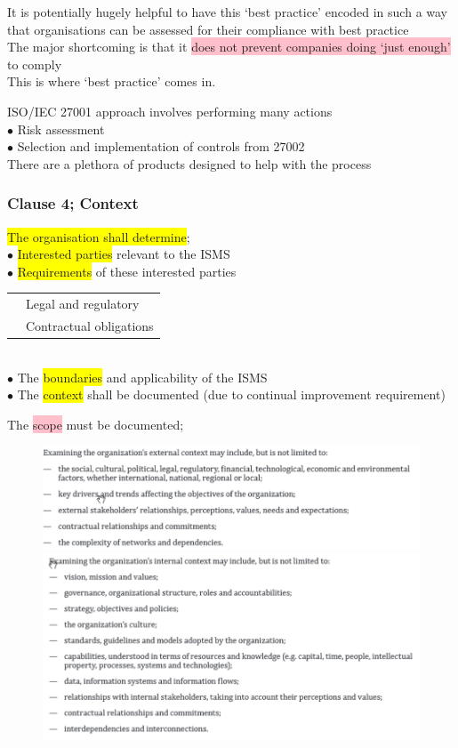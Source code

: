 \documentclass[tikz,border=10pt]{project_plan}
\newcommand{\bulletPoint}{\hspace{-3.1pt}$\bullet$ \hspace{5pt}}
\begin{document}
It is potentially hugely helpful to have this ‘best practice’ encoded in such a way that organisations can be assessed for their compliance with best practice\\
The major shortcoming is that it \colorbox{pink}{does not prevent companies doing ‘just enough’} to comply\\
This is where ‘best practice’ comes in.

ISO/IEC 27001 approach involves performing many actions\\
\bulletPoint Risk assessment\\
\bulletPoint Selection and implementation of controls from 27002\\
There are a plethora of products designed to help with the process

\newpage

\subsubsection{Clause 4; Context}
\colorbox{yellow}{The organisation shall determine};\\
\bulletPoint \colorbox{yellow}{Interested parties} relevant to the ISMS\\
\bulletPoint \colorbox{yellow}{Requirements} of these interested parties\\
\begin{tabular}{r |@{\bulletPoint} l}
   & Legal and regulatory    \\
   & Contractual obligations \\
\end{tabular}\\
\bulletPoint The \colorbox{yellow}{boundaries} and applicability of the ISMS\\
\bulletPoint The \colorbox{yellow}{context} shall be documented (due to continual improvement requirement)

The \colorbox{pink}{scope} must be documented;
\begin{figure}[h!]
  \centering
  \includegraphics[width=\linewidth]{27001_clause4_context_1.png}
  \includegraphics[width=\linewidth]{27001_clause4_context_2.png}
\end{figure}
\end{document}
